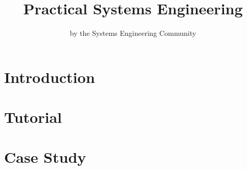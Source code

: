 \documentclass[twoside,10pt]{book}
\title{Practical Systems Engineering}
\author{by the Systems Engineering Community}
\begin{document}
        

\maketitle

\tableofcontents

\chapter{Introduction}


\chapter{Tutorial}


\chapter{Case Study}

\end{document}

